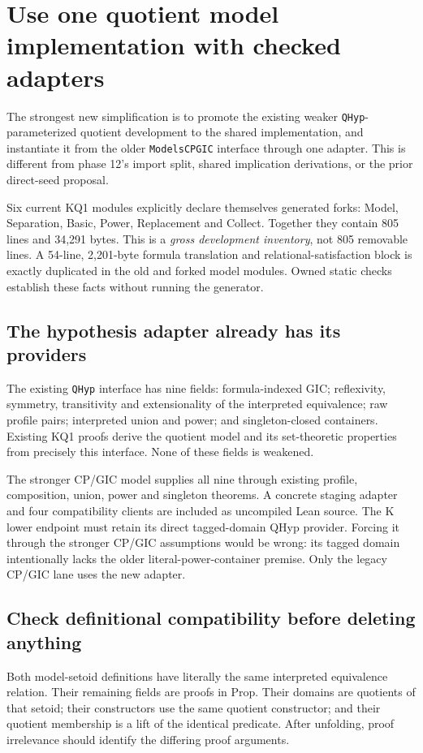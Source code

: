 \documentclass[11pt]{article}
\begin{document}
\section{Use one quotient model implementation with checked adapters}
The strongest new simplification is to promote the existing weaker \texttt{QHyp}-parameterized quotient development to the shared implementation, and instantiate it from the older \texttt{ModelsCPGIC} interface through one adapter. This is different from phase 12's import split, shared implication derivations, or the prior direct-seed proposal.

Six current KQ1 modules explicitly declare themselves generated forks: Model, Separation, Basic, Power, Replacement and Collect. Together they contain 805 lines and 34,291 bytes. This is a \emph{gross development inventory}, not 805 removable lines. A 54-line, 2,201-byte formula translation and relational-satisfaction block is exactly duplicated in the old and forked model modules. Owned static checks establish these facts without running the generator.

\subsection{The hypothesis adapter already has its providers}
The existing \texttt{QHyp} interface has nine fields: formula-indexed GIC; reflexivity, symmetry, transitivity and extensionality of the interpreted equivalence; raw profile pairs; interpreted union and power; and singleton-closed containers. Existing KQ1 proofs derive the quotient model and its set-theoretic properties from precisely this interface. None of these fields is weakened.

The stronger CP/GIC model supplies all nine through existing profile, composition, union, power and singleton theorems. A concrete staging adapter and four compatibility clients are included as uncompiled Lean source. The K lower endpoint must retain its direct tagged-domain QHyp provider. Forcing it through the stronger CP/GIC assumptions would be wrong: its tagged domain intentionally lacks the older literal-power-container premise. Only the legacy CP/GIC lane uses the new adapter.

\subsection{Check definitional compatibility before deleting anything}
Both model-setoid definitions have literally the same interpreted equivalence relation. Their remaining fields are proofs in Prop. Their domains are quotients of that setoid; their constructors use the same quotient constructor; and their quotient membership is a lift of the identical predicate. After unfolding, proof irrelevance should identify the differing proof arguments.
\end{document}
